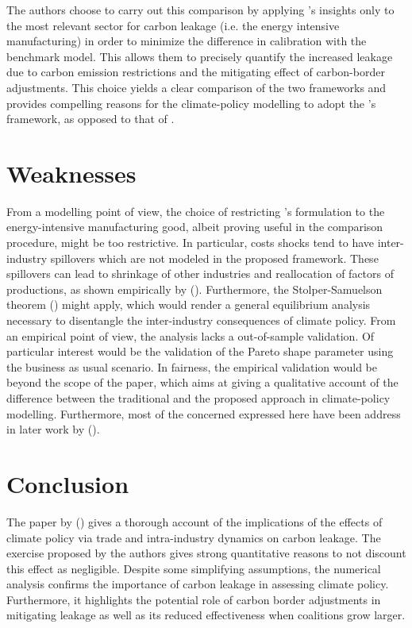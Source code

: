 \documentclass[american]{scrartcl}
\newcommand{\citein}[1]{\citeauthor{#1} (\citeyear{#1})}
\begin{document}
The authors choose to carry out this comparison by applying \citeauthor{Melitz2003}'s insights only to the most relevant sector for carbon leakage (i.e. the energy intensive manufacturing) in order to minimize the difference in calibration with the benchmark model. This allows them to precisely quantify the increased leakage due to carbon emission restrictions and the mitigating effect of carbon-border adjustments. This choice yields a clear comparison of the two frameworks and provides compelling reasons for the climate-policy modelling to adopt the \citeauthor{Melitz2003}'s framework, as opposed to that of \citeauthor{Armington1969}.


\section{Weaknesses}

From a modelling point of view, the choice of restricting \citeauthor{Melitz2003}'s formulation to the energy-intensive manufacturing good, albeit proving useful in the comparison procedure, might be too restrictive. In particular, costs shocks tend to have inter-industry spillovers which are not modeled in the proposed framework. These spillovers can lead to shrinkage of other industries and reallocation of factors of productions, as shown empirically by \citein{Melitz2012}. Furthermore, the Stolper-Samuelson theorem (\cite{Stolper1941}) might apply, which would render a general equilibrium analysis necessary to disentangle the inter-industry consequences of climate policy. From an empirical point of view, the analysis lacks a out-of-sample validation. Of particular interest would be the validation of the Pareto shape parameter using the business as usual scenario. In fairness, the empirical validation would be beyond the scope of the paper, which aims at giving a qualitative account of the difference between the traditional and the proposed approach in climate-policy modelling. Furthermore, most of the concerned expressed here have been address in later work by \citein{Balistreri2013}.

\section{Conclusion}

The paper by \citein{Balistreri2012} gives a thorough account of the implications of the effects of climate policy via trade and intra-industry dynamics on carbon leakage. The exercise proposed by the authors gives strong quantitative reasons to not discount this effect as negligible. Despite some simplifying assumptions, the numerical analysis confirms the importance of carbon leakage in assessing climate policy. Furthermore, it highlights the potential role of carbon border adjustments in mitigating leakage as well as its reduced effectiveness when coalitions grow larger.

\newpage
\nocite{*}
\printbibliography
\end{document}
